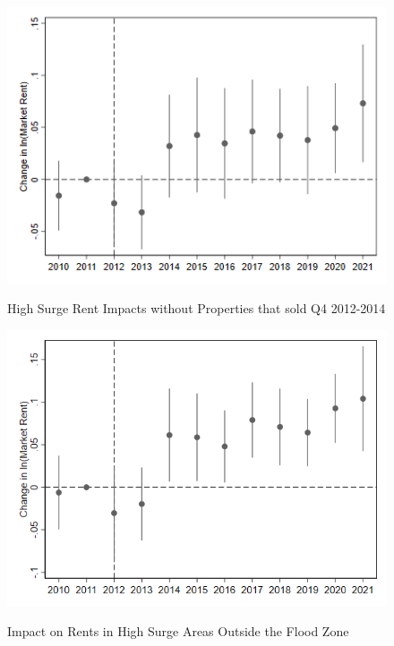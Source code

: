 \documentclass[12pt]{article}
\begin{document}
{{{{{{{{{\begin{figure}[h!]
\begin{center}
\caption{High Surge Rent Impacts without Properties that sold Q4 2012-2014}
\includegraphics[scale = 0.65]{Sales/R19 High Surge Rent Impacts_dropsale1214.png}
\label{fig:dropsale1214}
\end{center}
\end{figure}


\begin{figure}[h!]
\begin{center}
\caption{Impact on Rents in High Surge Areas Outside the Flood Zone}
\includegraphics[scale = 0.65]{Information/R7 High Surge Outside FLood Zone.png}
\label{fig:outsidefz}
\end{center}
\end{figure}

}}}}}}}}}
\end{document}
